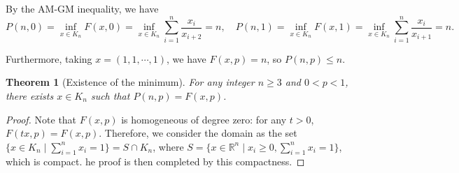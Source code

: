 \documentclass[a4paper,fleqn,numbers]{cas-sc}
\newtheorem{theorem}{Theorem}[section]
\begin{document}
	By the AM-GM inequality, we have
	\[
	P(n,0)=\inf\limits_{x \in K_n} F(x,0)=\inf\limits_{x \in K_n} \sum_{i=1}^{n} \frac{x_i}{x_{i+2}}=n,\quad
	P(n,1)=\inf\limits_{x \in K_n} F(x,1)=\inf\limits_{x \in K_n} \sum_{i=1}^{n} \frac{x_i}{x_{i+1}}=n.
	\]
	
	Furthermore, taking $x=(1,1,\cdots,1)$, we have $F(x,p)=n$, so $P(n,p)\leq n$.
	
	\begin{theorem}[Existence of the minimum]
		For any integer $n\geq 3$ and $0<p<1$, there exists $x \in K_n$ such that $P(n,p)=F(x,p)$.
	\end{theorem}
	
	\begin{proof}
		Note that \(F(x, p)\) is homogeneous of degree zero: for any \(t > 0\), \(F(tx, p) = F(x, p)\). Therefore, we consider the domain as the set \(\{ x \in K_n \mid \sum_{i=1}^n x_i = 1 \}=S\cap K_n\), where $S= \{ x \in \mathbb{R}^n \mid x_i \geq 0, \sum_{i=1}^n x_i = 1 \}$, which is compact. he proof is then completed by this compactness. 
	\end{proof}
	
%		
%		
%		
	
\end{document}

